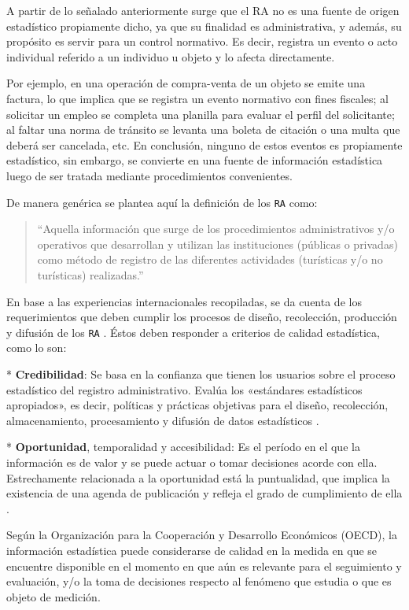\documentclass[
]{book}
\begin{document}
A partir de lo señalado anteriormente surge que el RA no es una fuente de origen estadístico propiamente dicho, ya que su finalidad es administrativa, y además, su propósito es servir para un control normativo. Es decir, registra un evento o acto individual referido a un individuo u objeto y lo afecta directamente.

Por ejemplo, en una operación de compra-venta de un objeto se emite una factura, lo que implica que se registra un evento normativo con fines fiscales; al solicitar un empleo se completa una planilla para evaluar el perfil del solicitante; al faltar una norma de tránsito se levanta una boleta de citación o una multa que deberá ser cancelada, etc. En conclusión, ninguno de estos eventos es propiamente estadístico, sin embargo, se convierte en una fuente de información estadística luego de ser tratada mediante procedimientos convenientes.

De manera genérica se plantea aquí la definición de los \texttt{RA} como:

\begin{quote}
``Aquella información que surge de los procedimientos administrativos y/o operativos que desarrollan y utilizan las instituciones (públicas o privadas) como método de registro de las diferentes actividades (turísticas y/o no turísticas) realizadas.''
\end{quote}

En base a las experiencias internacionales recopiladas, se da cuenta de los requerimientos que deben cumplir los procesos de diseño, recolección, producción y difusión de los \texttt{RA} \citep{dane2010a}. Éstos deben responder a criterios de calidad estadística, como lo son:

* \textbf{Credibilidad}: Se basa en la confianza que tienen los usuarios sobre el proceso estadístico del registro administrativo. Evalúa los «estándares estadísticos apropiados», es decir, políticas y prácticas objetivas para el diseño, recolección, almacenamiento, procesamiento y difusión de datos estadísticos \citep{ine2007}.

* \textbf{Oportunidad}, temporalidad y accesibilidad: Es el período en el que la información es de valor y se puede actuar o tomar decisiones acorde con ella. Estrechamente relacionada a la oportunidad está la puntualidad, que implica la existencia de una agenda de publicación y refleja el grado de cumplimiento de ella \citep{oecd2003}.

Según la Organización para la Cooperación y Desarrollo Económicos (OECD), la información estadística puede considerarse de calidad en la medida en que se encuentre disponible en el momento en que aún es relevante para el seguimiento y evaluación, y/o la toma de decisiones respecto al fenómeno que estudia o que es objeto de medición.
\end{document}
